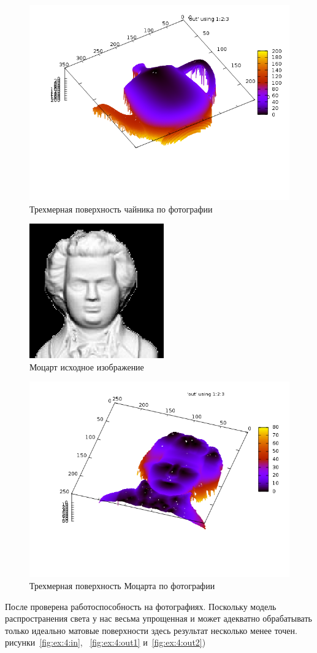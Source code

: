 \begin{figure}[H]
  \centering
  \includegraphics[width=0.5\linewidth]{img/teapot.png}
  \hfil \caption{Трехмерная поверхность чайника по фотографии}
  \label{fig:ex:2:out}
\end{figure}

\begin{figure}[H]
  \centering
  \includegraphics[width=0.5\linewidth]{img/mozart_in.png}
  \hfil \caption{Моцарт исходное изображение}
  \label{fig:ex:3:in}
\end{figure}

\begin{figure}[H]
  \centering
  \includegraphics[width=0.5\linewidth]{img/mozart.png}
  \hfil \caption{Трехмерная поверхность Моцарта по фотографии}
  \label{fig:ex:3:out}
\end{figure}

После проверена работоспособность на фотографиях. Поскольку модель
распространения света у нас весьма упрощенная и может адекватно
обрабатывать только идеально матовые поверхности здесь результат
несколько менее точен. рисунки~\ref{fig:ex:4:in}, ~\ref{fig:ex:4:out1}
и~\ref{fig:ex:4:out2})

